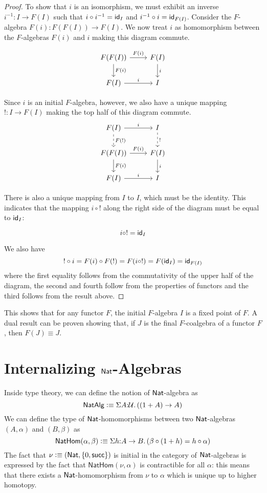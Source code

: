 \documentclass[11pt]{article}
\newcommand*{\z}{0}
\newcommand*{\s}{\mathsf{succ}}
\newcommand*{\comp}{\circ}
\begin{document}
\begin{proof}
To show that $i$ is an isomorphism, we must exhibit an inverse
$i^{-1}: I \to F(I)$
such that $i \comp i^{-1} = \id_I$ and $i^{-1} \comp i = \id_{F(I)}$.
Consider the $F$-algebra $F(i): F(F(I)) \to F(I)$. We now treat $i$ as
homomorphism between the $F$-algebras $F(i)$ and $i$ making this diagram
commute.

\[
\begin{tikzcd}
F(F(I)) \arrow{d}{F(i)} \arrow{r}{F(i)} & F(I) \arrow{d}{i}\\
F(I) \arrow{r}{i} & I
\end{tikzcd}
\]

Since $i$ is an initial $F$-algebra, however, we also have a unique mapping
$!: I \to F(I)$ making the top half of this diagram commute.
\[
\begin{tikzcd}
F(I) \arrow[dashed]{d}{F(!)} \arrow{r}{i} & I \arrow[dashed]{d}{!}\\
F(F(I)) \arrow{d}{F(i)} \arrow{r}{F(i)} & F(I) \arrow{d}{i}\\
F(I) \arrow{r}{i} & I
\end{tikzcd}
\]

There is also a unique mapping from $I$ to $I$, which must be the identity.
This indicates that the mapping $i \comp !$ along the right side of the
diagram must be equal to $\textsf{id}_I$:

\[i \comp ! = \id_I\]

We also have
\[! \comp i = F(i) \comp F(!) = F(i \comp !) = F(\id_I) = \id_{F(I)}\]
where the first equality follows from the commutativity of the upper half of
the diagram, the second and fourth follow from the properties of functors
and the third follows from the result above.
\end{proof}

This shows that for any functor $F$, the initial $F$-algebra $I$ is a fixed
point of $F$. A dual result can be proven showing that, if $J$ is the final 
$F$-coalgebra of a functor $F$, then $F(J) \equiv J$.

\section{Internalizing $\mathsf{Nat}$-Algebras}

Inside type theory, we can define the notion of $\mathsf{Nat}$-algebra as
\[
\mathsf{NatAlg} \vcentcolon\equiv \Sigma A{:}\mathcal{U}.\, ((1 + A) \to A)
\]
We can define the type of $\mathsf{Nat}$-homomorphisms between two $\mathsf{Nat}$-algebras $(A,\alpha)$ and $(B,\beta)$ as
\[
\mathsf{NatHom}(\alpha,\beta) \vcentcolon\equiv \Sigma h{:}A \to B.\, (\beta \circ (1 + h) = h \circ \alpha)
\]
The fact that $\nu \defeq \tuple{\Nat}{\{\z, \s\}}$ is initial in the category of $\mathsf{Nat}$-algebras is expressed by the fact that $\mathsf{NatHom}(\nu,\alpha)$ is contractible for all $\alpha$: this means that there exists a $\mathsf{Nat}$-homomorphism from $\nu$ to $\alpha$ which is unique up to higher homotopy.
\end{document}
